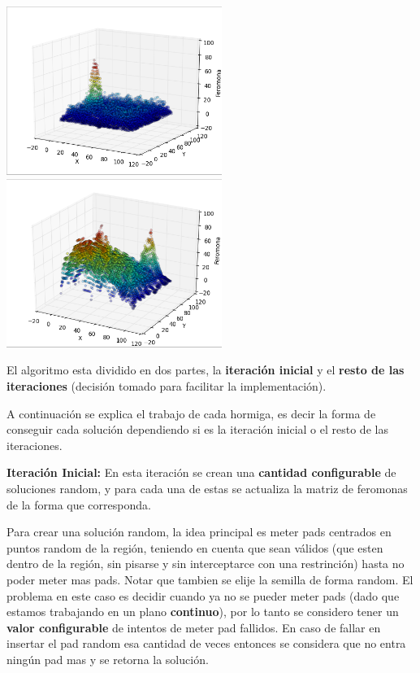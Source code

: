 \begin{center}

\includegraphics[width=7cm]{imagenes/fero0}
\includegraphics[width=7cm]{imagenes/fero1}
\end{center}


El algoritmo esta dividido en dos partes, la \textbf{iteraci\'on inicial} y el \textbf{resto de las iteraciones} (decisi\'on tomado para facilitar la implementaci\'on). 

A continuaci\'on se explica el trabajo de cada hormiga, es decir la forma de conseguir cada soluci\'on dependiendo si es la iteraci\'on inicial o el resto de las iteraciones.

\textbf{Iteraci\'on Inicial:} En esta iteraci\'on se crean una \textbf{cantidad configurable} de soluciones random, y para cada una de estas se actualiza la matriz de feromonas de la forma que corresponda. 

Para crear una soluci\'on random, la idea principal es meter pads centrados en puntos random de la regi\'on, teniendo en cuenta que sean v\'alidos (que esten dentro de la regi\'on, sin pisarse y sin interceptarce con una restrinci\'on) hasta no poder meter mas pads. Notar que tambien se elije la semilla de forma random. El problema en este caso es decidir cuando ya no se pueder meter pads (dado que estamos trabajando en un plano \textbf{continuo}), por lo tanto se considero tener un \textbf{valor configurable} de intentos de meter pad fallidos. En caso de fallar en insertar el pad random esa cantidad de veces entonces se considera que no entra ning\'un pad mas y se retorna la soluci\'on. 

